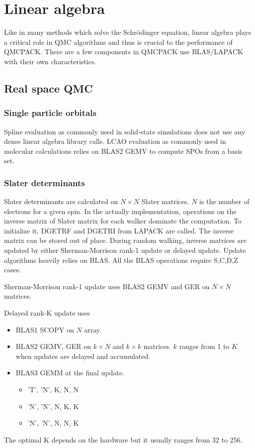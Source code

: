 \section{Linear algebra}

Like in many methods which solve the Schr\"odinger equation, linear algebra plays a critical role in QMC algorithms and thus is crucial to the performance of QMCPACK.
There are a few components in QMCPACK use BLAS/LAPACK with their own characteristics.

\subsection{Real space QMC}
\subsubsection{Single particle orbitals}
Spline evaluation as commonly used in solid-state simulations does not use any dense linear algebra library calls.
LCAO evaluation as commonly used in molecular calculations relies on BLAS2 GEMV to compute SPOs from a basis set.

\subsubsection{Slater determinants}
Slater determinants are calculated on $N \times N$ Slater matrices. $N$ is the number of electrons for a given spin.
In the actually implementation, operations on the inverse matrix of Slater matrix for each walker dominate the computation.
To initialize it, DGETRF and DGETRI from LAPACK are called. The inverse matrix can be stored out of place.
During random walking, inverse matrices are updated by either Sherman-Morrison rank-1 update or delayed update.
Update algorithms heavily relies on BLAS. All the BLAS operations require S,C,D,Z cases.

Sherman-Morrison rank-1 update uses BLAS2 GEMV and GER on $N \times N$ matrices.

Delayed rank-K update uses
\begin{itemize}
  \item BLAS1 SCOPY on $N$ array.
  \item BLAS2 GEMV, GER on $k \times N$ and $k \times k$ matrices. $k$ ranges from 1 to $K$ when updates are delayed and accumulated.
  \item BLAS3 GEMM at the final update.
    \begin{itemize}
       \item 'T', 'N', K, N, N
       \item 'N', 'N', N, K, K
       \item 'N', 'N', N, N, K
    \end{itemize}
\end{itemize}
The optimal K depends on the hardware but it usually ranges from 32 to 256.

